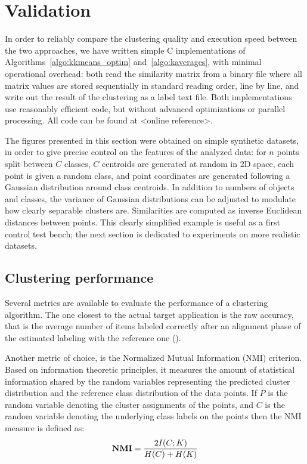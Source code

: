 \documentclass[a4paper,twoside]{article}
\begin{document}
\section{Validation}
\label{sec:validation}

In order to reliably compare the clustering quality and execution speed between the two approaches, we have written simple C implementations of Algorithms~\ref{algo:kkmeans_optim} and~\ref{algo:kaverages}, with minimal operational overhead: both read the similarity matrix from a binary file where all matrix values are stored sequentially in standard reading order, line by line, and write out the result of the clustering as a label text file. Both implementations use reasonably efficient code, but without advanced optimizations or parallel processing. All code can be found at <online reference>.

The figures presented in this section were obtained on simple synthetic datasets, in order to give precise control on the features of the analyzed data: for $n$ points split between $C$ classes, $C$ centroids are generated at random in 2D space, each point is given a random class, and point coordinates are generated following a Gaussian distribution around class centroids. In addition to numbers of objects and classes, the variance of Gaussian distributions can be adjusted to modulate how clearly separable clusters are. Similarities are computed as inverse Euclidean distances between points. This clearly simplified example is useful as a first control test bench; the next section is dedicated to experiments on more realistic datasets.

\subsection{Clustering performance}

Several metrics are available to evaluate the performance of a clustering algorithm. The one closest to the actual target application is the raw accuracy, that is the average number of items labeled correctly after an alignment phase of the estimated labeling with the reference one (\cite{Kuhn1955Hungarian}).

Another metric of choice, is the Normalized Mutual Information (NMI) criterion. Based on information theoretic principles, it measures the amount of statistical information shared by the random variables representing the predicted cluster distribution and the reference class distribution of the data points. If $P$ is the random variable denoting the cluster assignments of the points, and $C$ is the random variable denoting the underlying class labels on the points then the NMI measure is defined as:
\begin{equation}
\textbf{NMI} = \frac{ 2\- I(C;K) }{H(C)+H(K)}
\end{equation}
\end{document}
